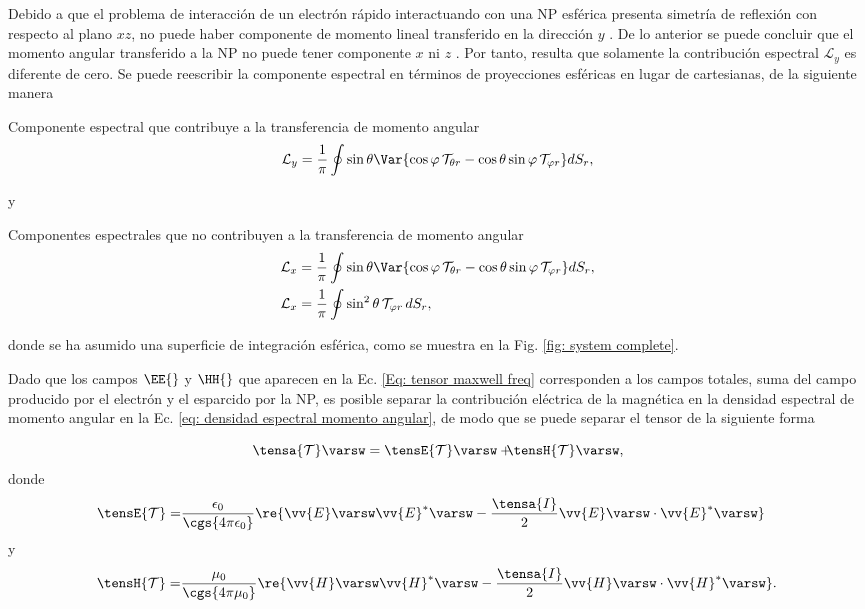 Debido a que el problema de interacción de un electrón rápido interactuando con una NP esférica presenta  simetría de reflexión con respecto al plano $xz$, no puede haber componente de momento lineal transferido en la dirección $y$ \cite{PRBCoronado}. De lo anterior se puede concluir que el momento angular transferido a la NP no puede tener componente $x$ ni $z$ \cite{castellanos2021phdthesis}. Por tanto, resulta que solamente la contribución espectral $\mathcal{L}_y$ es diferente de cero. Se puede reescribir la componente espectral en términos de proyecciones esféricas en lugar de cartesianas, de la siguiente manera \cite{castellanos2021phdthesis}
%
\begin{mybox}{\centering  Componente espectral que contribuye a la transferencia de momento angular}
\begin{equation}
\mathcal{L}_y = \frac{1}{\pi}\oint \sin\theta \Var{\cos\varphi \,\mathcal{T}_{\theta r} - \cos\theta\sin\varphi\,\mathcal{T}_{\varphi r}} dS_r,
\label{eq: Ly spectral density r theta}
\end{equation}
\end{mybox}	
% 
y
%
\begin{mybox}{\centering  Componentes espectrales que no contribuyen a la transferencia de momento angular}
\begin{align}
\mathcal{L}_x &= \frac{1}{\pi}\oint \sin\theta \Var{\cos\varphi \,\mathcal{T}_{\theta r} - \cos\theta\sin\varphi\,\mathcal{T}_{\varphi r}} dS_r,
\label{eq: Lx spectral density r theta} \\
\mathcal{L}_x &= \frac{1}{\pi}\oint \sin^2\theta \, \mathcal{T}_{\varphi r} \, dS_r,
\label{eq: Lz spectral density r theta}
\end{align}
\end{mybox}	
% 
\noindent donde se ha asumido una superficie de integración esférica, como se muestra en la Fig. \ref{fig: system complete}.

Dado que los campos $\EE{}$ y $\HH{}$ que aparecen en la Ec. \eqref{Eq: tensor maxwell freq} corresponden a los campos totales, suma del campo producido por el electrón y el esparcido por la NP, es posible separar la contribución eléctrica de la magnética en la densidad espectral de momento angular en la Ec. \eqref{eq: densidad espectral momento angular}, de modo que se puede separar el tensor de la siguiente forma

\begin{equation}
\tensa{\mathcal{T}}\varsw = \tensE{\mathcal{T}}\varsw+\hspace{-0.2 cm}\tensH{\mathcal{T}}\varsw, 
\end{equation}
donde 
\begin{align}
\tensE{\mathcal{T}}=& \frac{\epsilon_0}{\cgs{4\pi\epsilon_0}} \re{\vv{E}\varsw \vv{E}^{*}\varsw - \frac{\tensa{I}}{2} \vv{E}\varsw\cdot\vv{E}^{*}\varsw}
\end{align}
y
\begin{align}
\hspace{0.3 cm}\tensH{\mathcal{T}}=& \frac{\mu_0}{\cgs{4\pi\mu_0}} \re{\vv{H}\varsw \vv{H}^{*}\varsw - \frac{\tensa{I}}{2} \vv{H}\varsw\cdot\vv{H}^{*}\varsw}.
\end{align}

